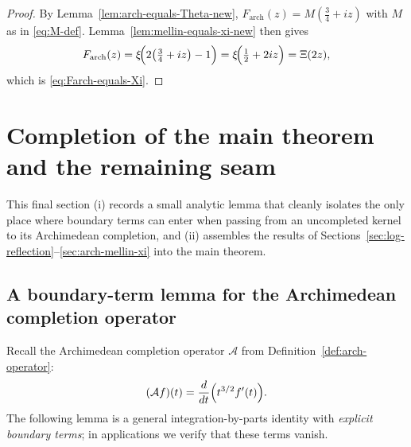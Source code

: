 \documentclass[12pt]{amsart}
\theoremstyle{definition}
\theoremstyle{remark}
\begin{document}
\begin{proof}
By Lemma~\ref{lem:arch-equals-Theta-new}, $F_{\mathrm{arch}}(z)=M(\tfrac34+iz)$ with $M$ as in
\eqref{eq:M-def}. Lemma~\ref{lem:mellin-equals-xi-new} then gives
\[
F_{\mathrm{arch}}(z)
=
\xi\!\Bigl(2\bigl(\tfrac34+iz\bigr)-1\Bigr)
=
\xi\!\Bigl(\tfrac12+2iz\Bigr)
=
\Xi(2z),
\]
which is \eqref{eq:Farch-equals-Xi}.
\end{proof}




\section{Completion of the main theorem and the remaining seam}
\label{sec:completion-ledger}

This final section (i) records a small analytic lemma that cleanly isolates the
only place where boundary terms can enter when passing from an uncompleted kernel
to its Archimedean completion, and (ii) assembles the results of
Sections~\ref{sec:log-reflection}--\ref{sec:arch-mellin-xi} into the main theorem.


\subsection{A boundary-term lemma for the Archimedean completion operator}
\label{subsec:boundary-lemma}

Recall the Archimedean completion operator $\mathcal A$ from
Definition~\ref{def:arch-operator}:
\[
(\mathcal A f)(t)=\frac{d}{dt}\Bigl(t^{3/2} f'(t)\Bigr).
\]
The following lemma is a general integration-by-parts identity with
\emph{explicit boundary terms}; in applications we verify that these terms vanish.
\end{document}
